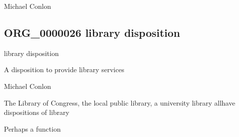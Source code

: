 \documentclass[letterpaper,10pt,english]{sphinxmanual}
\begin{document}
\begin{sphinxShadowBox}

\sphinxAtStartPar
Michael Conlon 
\end{sphinxShadowBox}
\begin{quote}

\ignorespaces \end{quote}


\subsection{ORG\_0000026 \sphinxhyphen{} library disposition}
\label{\detokenize{doc-ORG_0000026:org-0000026-library-disposition}}\label{\detokenize{doc-ORG_0000026:index-0}}\label{\detokenize{doc-ORG_0000026::doc}}
\begin{sphinxShadowBox}

\sphinxAtStartPar
library disposition
\end{sphinxShadowBox}

\begin{sphinxShadowBox}

\sphinxAtStartPar
A disposition to provide library services
\end{sphinxShadowBox}

\begin{sphinxShadowBox}

\sphinxAtStartPar
Michael Conlon 
\end{sphinxShadowBox}

\begin{sphinxShadowBox}

\sphinxAtStartPar
The Library of Congress, the local public library, a university library allhave dispositions of library
\end{sphinxShadowBox}

\begin{sphinxShadowBox}

\sphinxAtStartPar
Perhaps a function
\end{sphinxShadowBox}
\end{document}
